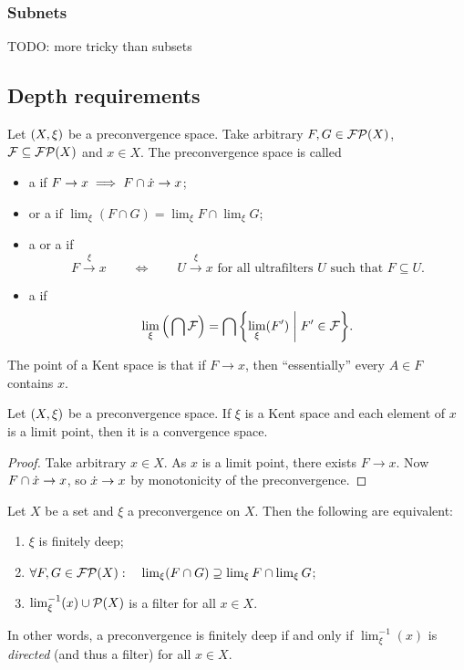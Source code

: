 \subsubsection{Subnets}
TODO: more tricky than subsets

\subsection{Depth requirements}
\begin{definition}
Let $\left( X,\xi \right)$ be a preconvergence space. Take arbitrary $F,G \in \operatorname{\mathcal{FP}}(X)$, $\mathcal{F}\subseteq \operatorname{\mathcal{FP}}(X)$ and $x\in X$. The preconvergence space is called
\begin{itemize}
\item a  if $F \to x \implies F\cap \dot{x} \to x$;
\item {} or a  if $\lim_\xi(F\cap G) = \lim_\xi F \cap \lim_\xi G$;
\item a  or a  if
\[ F\overset{\xi}{\longrightarrow} x \qquad\iff\qquad \text{$U\overset{\xi}{\longrightarrow} x$ for all ultrafilters $U$ such that $F\subseteq U$.} \]
\item a  if 
\[ \lim_\xi\Big(\bigcap \mathcal{F}\Big) = \bigcap \setbuilder{\lim_\xi(F')}{F'\in \mathcal{F}}. \]
\end{itemize}
\end{definition}

The point of a Kent space is that if $F\to x$, then ``essentially'' every $A\in F$ contains $x$.

\begin{lemma}
Let $\left( X,\xi \right)$ be a preconvergence space. If $\xi$ is a Kent space and each element of $x$ is a limit point, then it is a convergence space.
\end{lemma}
\begin{proof}
Take arbitrary $x\in X$. As $x$ is a limit point, there exists $F\to x$. Now $F\cap \dot{x} \to x$, so $\dot{x} \to x$ by monotonicity of the preconvergence.
\end{proof}

\begin{lemma} \label{finiteDepthLemma}
Let $X$ be a set and $\xi$ a preconvergence on $X$. Then the following are equivalent:
\begin{enumerate}
\item $\xi$ is finitely deep;
\item $\forall F,G \in \operatorname{\mathcal{FP}}(X): \quad \lim_\xi(F\cap G) \supseteq \lim_\xi F \cap \lim_\xi G$;
\item $\lim_\xi^{-1}(x)\cup \operatorname{\mathcal{P}}(X)$ is a filter for all $x\in X$.
\end{enumerate}
\end{lemma}
In other words, a preconvergence is finitely deep \textup{if and only if} $\lim_\xi^{-1}(x)$ is \emph{directed} (and thus a filter) for all $x\in X$.

